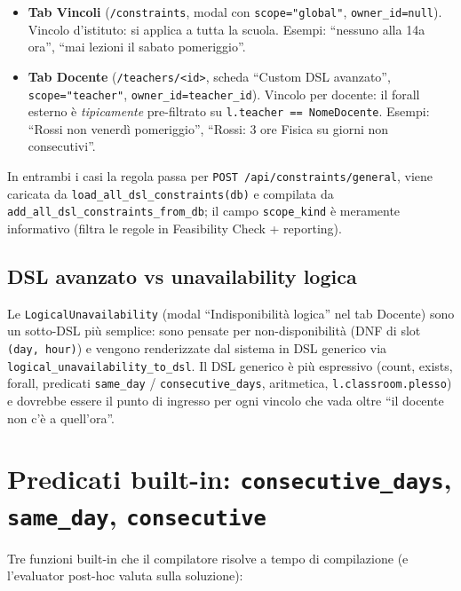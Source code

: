 \begin{itemize}
\item \textbf{Tab Vincoli} (\texttt{/constraints}, modal con
  \texttt{scope="global"}, \texttt{owner\_id=null}). Vincolo
  d'istituto: si applica a tutta la scuola. Esempi: ``nessuno
  alla 14a ora'', ``mai lezioni il sabato pomeriggio''.

\item \textbf{Tab Docente} (\texttt{/teachers/<id>}, scheda
  ``Custom DSL avanzato'', \texttt{scope="teacher"},
  \texttt{owner\_id=teacher\_id}). Vincolo per docente: il
  forall esterno \`e \emph{tipicamente} pre-filtrato su
  \texttt{l.teacher == NomeDocente}. Esempi: ``Rossi non venerd\`i
  pomeriggio'', ``Rossi: 3 ore Fisica su giorni non
  consecutivi''.
\end{itemize}

In entrambi i casi la regola passa per
\texttt{POST /api/constraints/general}, viene caricata da
\texttt{load\_all\_dsl\_constraints(db)} e compilata da
\texttt{add\_all\_dsl\_constraints\_from\_db}; il campo
\texttt{scope\_kind} \`e meramente informativo (filtra le regole
in Feasibility Check + reporting).

\subsection{DSL avanzato vs unavailability logica}

Le \texttt{LogicalUnavailability} (modal ``Indisponibilit\`a
logica'' nel tab Docente) sono un sotto-DSL pi\`u semplice:
sono pensate per non-disponibilit\`a (DNF di slot
\texttt{(day, hour)}) e vengono renderizzate dal sistema in DSL
generico via \texttt{logical\_unavailability\_to\_dsl}. Il DSL
generico \`e pi\`u espressivo (count, exists, forall, predicati
\texttt{same\_day} / \texttt{consecutive\_days}, aritmetica,
\texttt{l.classroom.plesso}) e dovrebbe essere il punto di
ingresso per ogni vincolo che vada oltre ``il docente non c'\`e a
quell'ora''.

\section{Predicati built-in: \texttt{consecutive\_days},
\texttt{same\_day}, \texttt{consecutive}}
\label{sec:dsl-predicates-ref}

Tre funzioni built-in che il compilatore risolve a tempo di
compilazione (e l'evaluator post-hoc valuta sulla soluzione):

